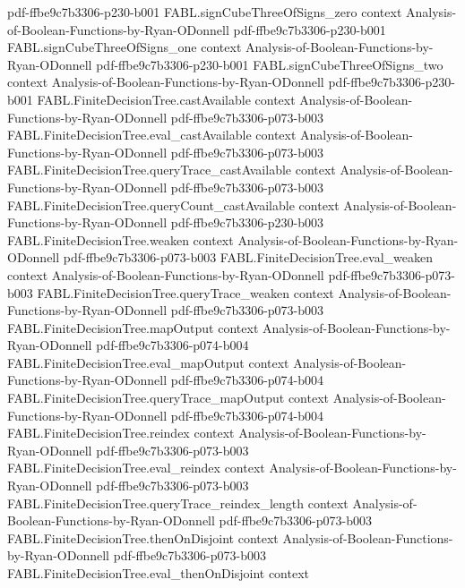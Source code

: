 \begin{theorem}
  {pdf-ffbe9c7b3306-p230-b001}
\proofstep
  {FABL.signCubeThreeOfSigns_zero}
  {context}
  {Analysis-of-Boolean-Functions-by-Ryan-ODonnell}
  {pdf-ffbe9c7b3306-p230-b001}
\proofstep
  {FABL.signCubeThreeOfSigns_one}
  {context}
  {Analysis-of-Boolean-Functions-by-Ryan-ODonnell}
  {pdf-ffbe9c7b3306-p230-b001}
\proofstep
  {FABL.signCubeThreeOfSigns_two}
  {context}
  {Analysis-of-Boolean-Functions-by-Ryan-ODonnell}
  {pdf-ffbe9c7b3306-p230-b001}
\proofstep
  {FABL.FiniteDecisionTree.castAvailable}
  {context}
  {Analysis-of-Boolean-Functions-by-Ryan-ODonnell}
  {pdf-ffbe9c7b3306-p073-b003}
\proofstep
  {FABL.FiniteDecisionTree.eval_castAvailable}
  {context}
  {Analysis-of-Boolean-Functions-by-Ryan-ODonnell}
  {pdf-ffbe9c7b3306-p073-b003}
\proofstep
  {FABL.FiniteDecisionTree.queryTrace_castAvailable}
  {context}
  {Analysis-of-Boolean-Functions-by-Ryan-ODonnell}
  {pdf-ffbe9c7b3306-p073-b003}
\proofstep
  {FABL.FiniteDecisionTree.queryCount_castAvailable}
  {context}
  {Analysis-of-Boolean-Functions-by-Ryan-ODonnell}
  {pdf-ffbe9c7b3306-p230-b003}
\proofstep
  {FABL.FiniteDecisionTree.weaken}
  {context}
  {Analysis-of-Boolean-Functions-by-Ryan-ODonnell}
  {pdf-ffbe9c7b3306-p073-b003}
\proofstep
  {FABL.FiniteDecisionTree.eval_weaken}
  {context}
  {Analysis-of-Boolean-Functions-by-Ryan-ODonnell}
  {pdf-ffbe9c7b3306-p073-b003}
\proofstep
  {FABL.FiniteDecisionTree.queryTrace_weaken}
  {context}
  {Analysis-of-Boolean-Functions-by-Ryan-ODonnell}
  {pdf-ffbe9c7b3306-p073-b003}
\proofstep
  {FABL.FiniteDecisionTree.mapOutput}
  {context}
  {Analysis-of-Boolean-Functions-by-Ryan-ODonnell}
  {pdf-ffbe9c7b3306-p074-b004}
\proofstep
  {FABL.FiniteDecisionTree.eval_mapOutput}
  {context}
  {Analysis-of-Boolean-Functions-by-Ryan-ODonnell}
  {pdf-ffbe9c7b3306-p074-b004}
\proofstep
  {FABL.FiniteDecisionTree.queryTrace_mapOutput}
  {context}
  {Analysis-of-Boolean-Functions-by-Ryan-ODonnell}
  {pdf-ffbe9c7b3306-p074-b004}
\proofstep
  {FABL.FiniteDecisionTree.reindex}
  {context}
  {Analysis-of-Boolean-Functions-by-Ryan-ODonnell}
  {pdf-ffbe9c7b3306-p073-b003}
\proofstep
  {FABL.FiniteDecisionTree.eval_reindex}
  {context}
  {Analysis-of-Boolean-Functions-by-Ryan-ODonnell}
  {pdf-ffbe9c7b3306-p073-b003}
\proofstep
  {FABL.FiniteDecisionTree.queryTrace_reindex_length}
  {context}
  {Analysis-of-Boolean-Functions-by-Ryan-ODonnell}
  {pdf-ffbe9c7b3306-p073-b003}
\proofstep
  {FABL.FiniteDecisionTree.thenOnDisjoint}
  {context}
  {Analysis-of-Boolean-Functions-by-Ryan-ODonnell}
  {pdf-ffbe9c7b3306-p073-b003}
\proofstep
  {FABL.FiniteDecisionTree.eval_thenOnDisjoint}
  {context}

\end{theorem}
